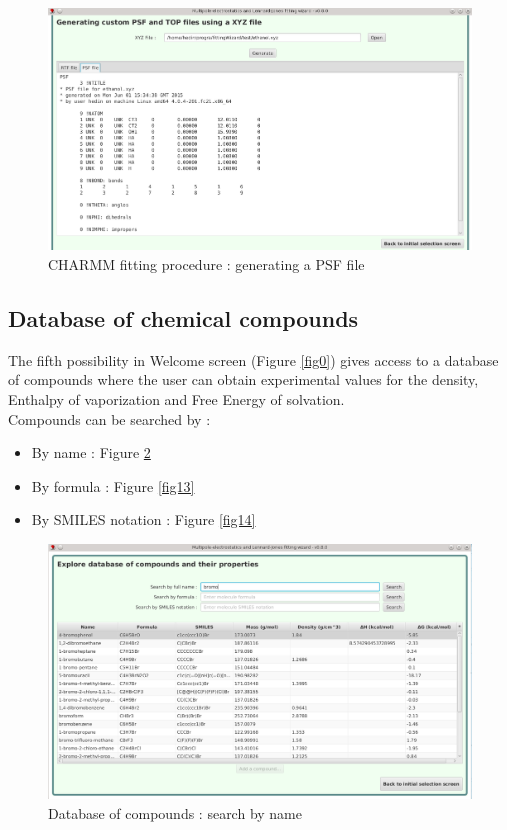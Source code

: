 \documentclass[12pt,a4paper]{article}
\begin{document}
\begin{figure}[h!]
\centering
\includegraphics[width=0.9\linewidth]{pics/scr16}
\caption{CHARMM fitting procedure : generating a PSF file}
\label{fig16}
\end{figure}


\clearpage

\subsection{Database of chemical compounds}

The fifth possibility in Welcome screen (Figure \ref{fig0}) gives access to a database of 
compounds where the user can obtain experimental values for the density, Enthalpy of vaporization 
and Free Energy of solvation.\\

Compounds can be searched by : 

\begin{itemize}
\item By name : Figure \ref{fig12}
\item By formula : Figure \ref{fig13}
\item By SMILES notation : Figure \ref{fig14}
\end{itemize}

\begin{figure}[h!]
\centering
\includegraphics[width=0.9\linewidth]{pics/scr12}
\caption{Database of compounds : search by name}
\label{fig12}
\end{figure}
\end{document}
